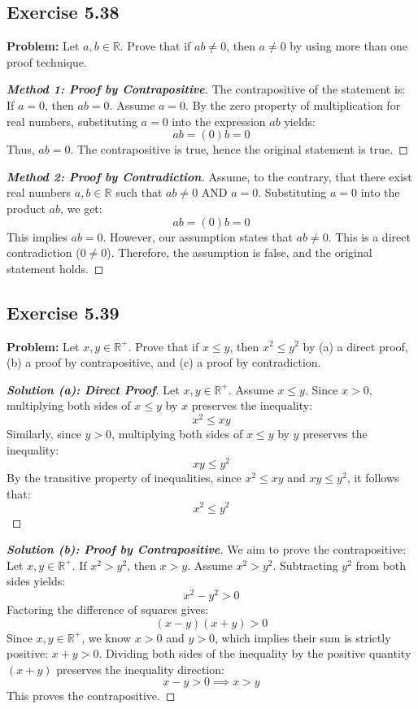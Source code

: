 \documentclass[11pt, a4paper]{article}
\theoremstyle{definition}
\theoremstyle{remark}
\newcommand{\R}{\mathbb{R}}
\begin{document}
\subsection{Exercise 5.38}
\textbf{Problem:} Let $a, b \in \R$. Prove that if $ab \neq 0$, then $a \neq 0$ by using more than one proof technique.

\begin{proof}[\textbf{Method 1: Proof by Contrapositive}]
The contrapositive of the statement is: If $a = 0$, then $ab = 0$.
Assume $a = 0$. By the zero property of multiplication for real numbers, substituting $a = 0$ into the expression $ab$ yields:
\[ ab = (0)b = 0 \]
Thus, $ab = 0$. The contrapositive is true, hence the original statement is true.
\end{proof}

\begin{proof}[\textbf{Method 2: Proof by Contradiction}]
Assume, to the contrary, that there exist real numbers $a, b \in \R$ such that $ab \neq 0$ AND $a = 0$.
Substituting $a = 0$ into the product $ab$, we get:
\[ ab = (0)b = 0 \]
This implies $ab = 0$. However, our assumption states that $ab \neq 0$. This is a direct contradiction ($0 \neq 0$). Therefore, the assumption is false, and the original statement holds.
\end{proof}

\subsection{Exercise 5.39}
\textbf{Problem:} Let $x, y \in \R^+$. Prove that if $x \leq y$, then $x^2 \leq y^2$ by (a) a direct proof, (b) a proof by contrapositive, and (c) a proof by contradiction.

\begin{proof}[\textbf{Solution (a): Direct Proof}]
Let $x, y \in \R^+$. Assume $x \leq y$. 
Since $x > 0$, multiplying both sides of $x \leq y$ by $x$ preserves the inequality:
\[ x^2 \leq xy \]
Similarly, since $y > 0$, multiplying both sides of $x \leq y$ by $y$ preserves the inequality:
\[ xy \leq y^2 \]
By the transitive property of inequalities, since $x^2 \leq xy$ and $xy \leq y^2$, it follows that:
\[ x^2 \leq y^2 \]
\end{proof}

\begin{proof}[\textbf{Solution (b): Proof by Contrapositive}]
We aim to prove the contrapositive: Let $x, y \in \R^+$. If $x^2 > y^2$, then $x > y$.
Assume $x^2 > y^2$. Subtracting $y^2$ from both sides yields:
\[ x^2 - y^2 > 0 \]
Factoring the difference of squares gives:
\[ (x - y)(x + y) > 0 \]
Since $x, y \in \R^+$, we know $x > 0$ and $y > 0$, which implies their sum is strictly positive: $x + y > 0$. 
Dividing both sides of the inequality by the positive quantity $(x + y)$ preserves the inequality direction:
\[ x - y > 0 \implies x > y \]
This proves the contrapositive.
\end{proof}
\end{document}
